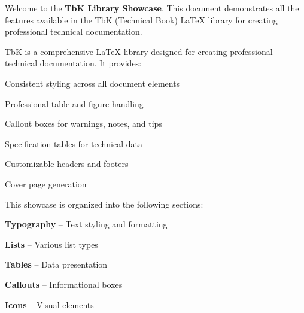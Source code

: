 \documentclass[11pt,a4paper]{article}
\begin{document}

\begin{tbkCover}
\end{tbkCover}

\clearpage


\tableofcontents
\clearpage



Welcome to the \textbf{TbK Library Showcase}. This document demonstrates all the features available in the TbK (Technical Book) LaTeX library for creating professional technical documentation.


TbK is a comprehensive LaTeX library designed for creating professional technical documentation. It provides:

\begin{tbkList}
  \item Consistent styling across all document elements
  \item Professional table and figure handling
  \item Callout boxes for warnings, notes, and tips
  \item Specification tables for technical data
  \item Customizable headers and footers
  \item Cover page generation
\end{tbkList}


This showcase is organized into the following sections:

\begin{tbkNumberedList}
  \item \textbf{Typography} -- Text styling and formatting
  \item \textbf{Lists} -- Various list types
  \item \textbf{Tables} -- Data presentation
  \item \textbf{Callouts} -- Informational boxes
  \item \textbf{Icons} -- Visual elements
\end{tbkNumberedList}
\end{document}
